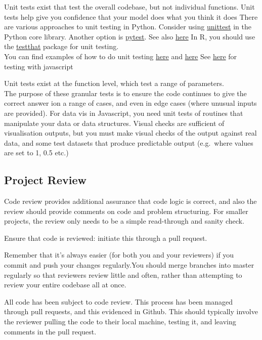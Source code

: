 \documentclass[]{book}
\begin{document}
Unit tests exist that test the overall codebase, but not individual functions.
Unit tests help give you confidence that your model does what you think it does
There are various approaches to unit testing in Python. Consider using \href{https://docs.python.org/3/library/unittest.html}{unittest} in the Python core library. Another option is \href{https://docs.pytest.org/en/latest/}{pytest}. See also \href{http://python-guide-pt-br.readthedocs.io/en/latest/writing/tests/}{here}
In R, you should use the \href{https://github.com/hadley/testthat}{testthat} package for unit testing.\\
You can find examples of how to do unit testing \href{https://github.com/ukgovdatascience/eesectors/tree/master/tests}{here} and \href{https://github.com/RobinL/costmodelr/tree/master/tests}{here} See \href{http://busypeoples.github.io/post/testing-d3-with-jasmine/}{here} for testing with javascript

Unit tests exist at the function level, which test a range of parameters.\\
The purpose of these granular tests is to ensure the code continues to give the correct answer ion a range of cases, and even in edge cases (where unusual inputs are provided).
For data vis in Javascript, you need unit tests of routines that manipulate your data or data structures. Visual checks are sufficient of visualisation outputs, but you must make visual checks of the output against real data, and some test datasets that produce predictable output (e.g.~where values are set to 1, 0.5 etc.)

\hypertarget{review}{%
\subsection{Project Review}\label{review}}

Code review provides additional assurance that code logic is correct, and also the review should provide comments on code and problem structuring.
For smaller projects, the review only needs to be a simple read-through and sanity check.

Ensure that code is reviewed: initiate this through a pull request.

Remember that it's always easier (for both you and your reviewers) if you commit and push your changes regularly.You should merge branches into master regularly so that reviewers review little and often, rather than attempting to review your entire codebase all at once.

All code has been subject to code review.
This process has been managed through pull requests, and this evidenced in Github. This should typically involve the reviewer pulling the code to their local machine, testing it, and leaving comments in the pull request.
\end{document}
